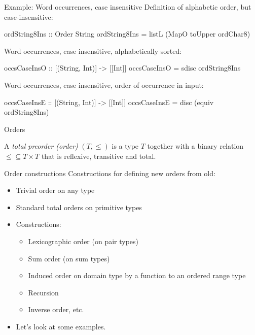\documentclass{beamer}
\begin{document}
\begin{frame}[fragile]{Example: Word occurrences, case insensitive}
  Definition of alphabetic order, but case-insensitive:
\begin{haskell}
ordString8Ins :: Order String
ordString8Ins = listL (MapO toUpper ordChar8)
\end{haskell}
  Word occurrences, case insensitive, alphabetically sorted:
\begin{haskell}
occsCaseInsO :: [(String, Int)] -> [[Int]]
occsCaseInsO = sdisc ordString8Ins
\end{haskell}
  Word occurrences, case insensitive, order of occurrence in input:
\begin{haskell}
occsCaseInsE :: [(String, Int)] -> [[Int]]
occsCaseInsE = disc (equiv ordString8Ins)
\end{haskell}
\end{frame}

\begin{frame}{Orders}
  \begin{definition}
    A \emph{total preorder (order)} $(T, \leq)$ is a type $T$ together with a
    binary relation $\leq \subseteq T \times T$ that is reflexive, transitive
    and total.
  \end{definition}
\end{frame}

\begin{frame}{Order constructions}
  Constructions for defining new orders from old:
  \begin{itemize}
  \item Trivial order on any type
  \item Standard total orders on primitive types
  \item Constructions:
    \begin{itemize}
    \item Lexicographic order (on pair types)
    \item Sum order (on sum types)
    \item Induced order on domain type by a function to an ordered range
      type
    \item Recursion
    \item Inverse order, etc.
    \end{itemize}
  \item Let's look at some examples.
  \end{itemize}
\end{frame}
\end{document}
